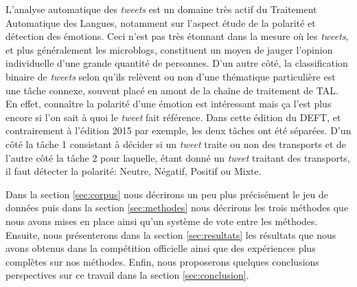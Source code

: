 
 L'analyse automatique des \textit{tweets} est un domaine très actif du Traitement Automatique des Langues, notamment sur l'aspect étude de la polarité et détection des émotions.
 Ceci n'est pas très étonnant dans la mesure où les \textit{tweets}, et plus généralement les microblogs, constituent un moyen de jauger l'opinion individuelle d'une grande quantité de personnes.
 D'un autre côté, la classification binaire de \textit{tweets} selon qu'ils relèvent ou non d'une thématique particulière est une tâche connexe, souvent placé en amont de la chaîne de traitement de TAL. En effet, connaître la polarité d'une émotion est intéressant mais ça l'est plus encore si l'on sait à quoi le \textit{tweet} fait référence.
 Dans cette édition du DEFT, et contrairement à l'édition 2015 par exemple, les deux tâches ont été séparées. D'un côté la tâche 1 consistant à décider si un \textit{tweet} traite ou non des transports et de l'autre côté la tâche 2 pour laquelle, étant donné un \textit{tweet} traitant des transports, il faut détecter la polarité: Neutre, Négatif, Positif ou Mixte.

 Dans la section \ref{sec:corpus} nous décrirons un peu plus précisément le jeu de données puis dans la section \ref{sec:methodes} nous décrirons les trois méthodes que nous avons mises en place ainsi qu'un système de vote entre les méthodes.
 Ensuite, nous présenterons dans la section \ref{sec:resultats} les résultats que nous avons obtenus dans la compétition officielle ainsi que des expériences plus complètes sur nos méthodes.
 Enfin, nous proposerons quelques conclusions perspectives sur ce travail dans la section \ref{sec:conclusion}.
 

